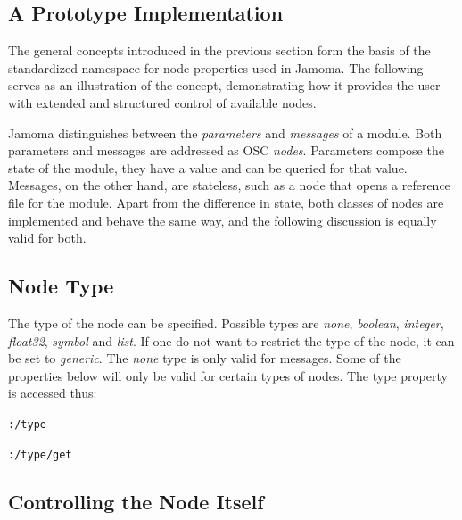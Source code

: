 \documentclass{NIME-alternate}
\begin{document}
\begin{Abstract}

\section{A Prototype Implementation} %
\label{sec:prototype_implementation}

The general concepts introduced in the previous section form the basis of the standardized namespace for node properties used in Jamoma. The following serves as an illustration of the concept, demonstrating how it provides the user with extended and structured control of available nodes.

Jamoma distinguishes between the \emph{parameters} and \emph{messages} of a module.  Both parameters and messages are addressed as OSC \emph{nodes}.  Parameters compose the state of the module, they have a value and can be queried for that value. Messages, on the other hand, are stateless, such as a node that opens a reference file for the module. Apart from the difference in state, both classes of nodes are implemented and behave the same way, and the following discussion is equally valid for both. 




\subsection{Node Type} %
\label{sub:type}

The type of the node can be specified. Possible types are \emph{none}, \emph{boolean}, \emph{integer}, \emph{float32}, \emph{symbol} and \emph{list}. If one do not want to restrict the type of the node, it can be set to \emph{generic}. The \emph{none} type is only valid for messages. Some of the properties below will only be valid for certain types of nodes. The type property is accessed thus:

\texttt{:/type}

\texttt{:/type/get}





\subsection{Controlling the Node Itself} %
\label{sub:controlling_the_node_itself}


\end{Abstract}
\end{document}
